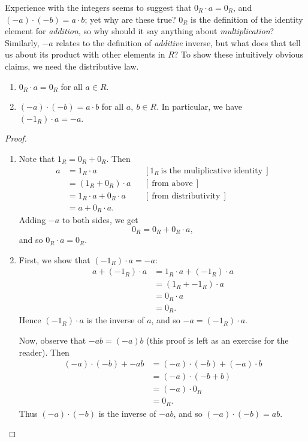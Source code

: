 \documentclass[math1530-lecture-notes]{subfiles}
\begin{document}
Experience with the integers seems to suggest that $0_R\cdot a=0_R$, and $(-a)\cdot (-b)=a\cdot b$;
yet why are these true? $0_R$ is the definition of the identity element for \textit{addition}, so
why should it say anything about \textit{multiplication}? Similarly, $-a$ relates to the definition
of \textit{additive} inverse, but what does that tell us about its product with other elements in
$R$? To show these intuitively obvious claims, we need the distributive law.

\begin{proposition}[]{}
  \begin{enumerate}
    \item $0_R\cdot a=0_R$ for all $a\in R$.
    \item $(-a)\cdot (-b)=a\cdot b$ for all $a,\ b\in R$. In particular, we have $(-1_R)\cdot a=-a$.
  \end{enumerate}
\end{proposition}
\begin{proof}[Proof]
  \begin{enumerate}
    \item Note that $1_R=0_R+0_R$. Then
      \begin{align*}
        a &= 1_R\cdot a && [1_R~\text{is the muliplicative identity}~]\\
          &= (1_R+0_R)\cdot a &&[~\text{from above}~]\\
          &= 1_R\cdot a+0_R\cdot a && [~\text{from distributivity}~] \\
          &= a+0_R\cdot a
      .\end{align*}
      Adding $-a$ to both sides, we get \[
        0_R = 0_R + 0_R\cdot a
      ,\] and so $0_R \cdot a=0_R$.

    \item First, we show that $(-1_R)\cdot a=-a$:
      \begin{align*}
        a + (-1_R)\cdot a&= 1_R\cdot a+(-1_R)\cdot a \\
                         &= (1_R+ -1_R)\cdot a \\
                         &= 0_R\cdot a \\
                         &= 0_R
       .\end{align*}
       Hence $(-1_R)\cdot a$ is the inverse of $a$, and so $-a=(-1_R)\cdot a$.

       Now, observe that $-ab = (-a)b$ (this proof is left as an exercise for the reader). Then
       \begin{align*}
         (-a)\cdot (-b) + -ab &= (-a)\cdot (-b) + (-a)\cdot b \\
                              &= (-a)\cdot (-b+b) \\
                              &= (-a)\cdot 0_R \\
                              &= 0_R
      .\end{align*}
      Thus $(-a)\cdot (-b)$ is the inverse of $-ab$, and so $(-a)\cdot (-b)=ab$.
  \end{enumerate}
\end{proof}
\end{document}
